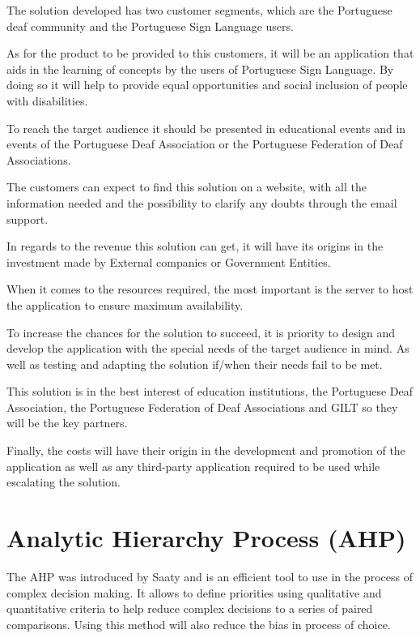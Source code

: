 The solution developed has two customer segments, which are the Portuguese deaf community and the Portuguese Sign Language users.

As for the product to be provided to this customers, it will be an application that aids in the learning of concepts by the users of Portuguese Sign Language.
By doing so it will help to provide equal opportunities and social inclusion of people with disabilities.

To reach the target audience it should be presented in educational events and in events of the Portuguese Deaf Association or the Portuguese Federation of Deaf Associations.

The customers can expect to find this solution on a website, with all the information needed and the possibility to clarify any doubts through the email support.

In regards to the revenue this solution can get, it will have its origins in the investment made by External companies or Government Entities.

When it comes to the resources required, the most important is the server to host the application to ensure maximum availability.

To increase the chances for the solution to succeed, it is priority to design and develop the application with the special needs of the target audience in mind.
As well as testing and adapting the solution if/when their needs fail to be met.

This solution is in the best interest of education institutions, the Portuguese Deaf Association, the Portuguese Federation of Deaf Associations and GILT so they will be the key partners.

Finally, the costs will have their origin in the development and promotion of the application as well as any third-party application required to be used while escalating the solution.

\section{Analytic Hierarchy Process (AHP)}

The \gls{AHP} was introduced by Saaty\cite{saaty1987analytic} and is an efficient tool to use in the process of complex decision making.
It allows to define priorities using qualitative and quantitative criteria to help reduce complex decisions to a series of paired comparisons.
Using this method will also reduce the bias in process of choice.

